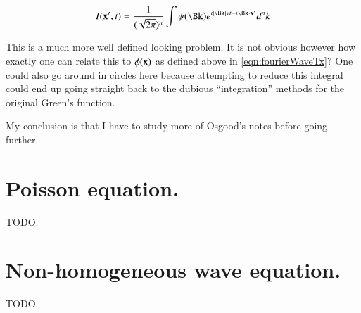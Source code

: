 \documentclass{article}
\begin{document}
\begin{align*}
I(\Bx', t) = \frac{1}{(\sqrt{2\pi})^n} \int \psi(\Bk) e^{i \Abs{\Bk} v t - i \Bk \cdot \Bx' } d^n k 
\end{align*}

This is a much more well defined looking problem.  It is not obvious however how exactly one can relate this to $\phi(\mathbf{x})$ as defined above in \ref{eqn:fourierWaveTx}?  One could also go around in circles here because attempting to reduce this integral could end up going straight back to the dubious ``integration'' methods for the original Green's function.

My conclusion is that I have to study more of Osgood's notes before going further.

\section{ Poisson equation. }

TODO.

\section{ Non-homogeneous wave equation. }

TODO.



\end{document}
